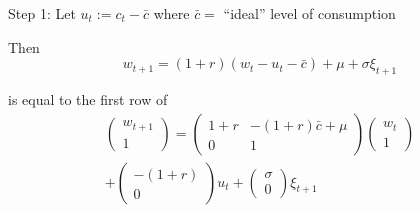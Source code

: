 \begin{frame}

    Step 1: Let $u_t := c_t - \bar c$ where $\bar c =$ ``ideal'' level of consumption

        \vspace{0.5em}
        \vspace{0.5em}
    Then
    \begin{equation*}
        w_{t+1} = (1 + r) (w_t - u_t - \bar c) + \mu + \sigma \xi_{t+1} 
    \end{equation*}


        \vspace{0.5em}
    is equal to the first row of
    \begin{multline*}
        \left(
        \begin{array}{c}
            w_{t+1} \\
            1
        \end{array}
        \right)
        =
        \left(
        \begin{array}{cc}
            1 + r & -(1 + r) \bar c + \mu \\
            0     & 1
        \end{array}
        \right)
        \left(
        \begin{array}{c}
            w_t \\
            1
        \end{array}
        \right)
        \\
        +
        \left(
        \begin{array}{c}
            -(1 + r) \\
            0
        \end{array}
        \right)
            u_t
            +
        \left(
        \begin{array}{c}
        \sigma \\
            0
        \end{array}
        \right)
        \xi_{t+1}
    \end{multline*}

\end{frame}


